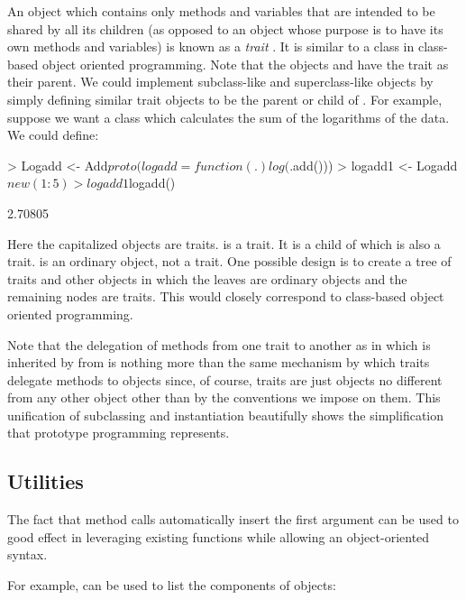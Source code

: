 \documentclass{Z}
\begin{document}
An object which contains only methods and variables that are
intended to be shared by all its children (as opposed to an
object whose purpose is to have its own methods and variables)
is known as a \emph{trait} \citep{Agesen1992}.  It 
is similar to a class in class-based
object oriented programming.   
Note that the objects  and  have the trait
 as their parent.  We could implement subclass-like and
superclass-like objects by simply defining similar trait objects to 
be the parent or child of .  For example, suppose we
want a class which calculates the sum of the logarithms of the data.  We
could define:

\begin{Schunk}
\begin{Sinput}
> Logadd <- Add$proto(logadd = function(.) log(.$add()))
> logadd1 <- Logadd$new(1:5)
> logadd1$logadd()
\end{Sinput}
\begin{Soutput}
[1] 2.70805
\end{Soutput}
\end{Schunk}

Here the capitalized objects are traits.
 is a trait.  It is a child of 
which is also a trait.   is an ordinary object,
not a trait.
One possible design is to create a tree of traits and other objects
in which the leaves are ordinary objects and the remaining nodes
are traits.  This would closely correspond to class-based
object oriented programming.  

Note that the delegation of methods from
one trait to another as in
 which is inherited by  from 
is nothing more than the same mechanism by which traits delegate
methods to
objects since, of course, traits are just objects no different
from any other object other than by the conventions we impose on them.
This unification of subclassing and instantiation beautifully
shows the simplification that prototype programming represents.

\subsection{Utilities}
\label{sec:utilities}
The fact that method calls automatically insert the first argument
can be used to good effect in leveraging existing 
functions while allowing an object-oriented syntax.

For example,  can be used to list the components of
 objects:
\end{document}
